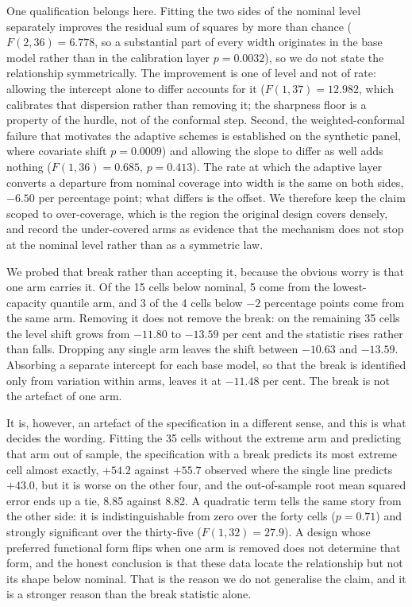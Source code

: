 \documentclass[preprint,3p,times]{elsarticle}
\providecommand{\DIFaddtex}[1]{{\protect\color{blue} \sf #1}} %
\providecommand{\DIFdeltex}[1]{{\protect\color{red} \scriptsize #1}} %
\providecommand{\DIFaddbegin}{} %
\providecommand{\DIFaddend}{} %
\providecommand{\DIFdelbegin}{} %
\providecommand{\DIFdelend}{} %
\providecommand{\DIFadd}[1]{\texorpdfstring{\DIFaddtex{#1}}{#1}} %
\providecommand{\DIFdel}[1]{\texorpdfstring{\DIFdeltex{#1}}{}} %
\begin{document}
\DIFadd{One qualification belongs here. Fitting the two sides of the nominal level separately improves the residual sum of squares by more than chance ($F(2,36)=6.778$}\DIFaddend , \DIFdelbegin \DIFdel{so a substantial part of every width originates in the base model rather than in the calibration layer }\DIFdelend \DIFaddbegin \DIFadd{$p=0.0032$), so we do not state the relationship symmetrically. The improvement is one of level and not of rate: allowing the intercept alone to differ accounts for it ($F(1,37)=12.982$}\DIFaddend , \DIFdelbegin \DIFdel{which calibrates that dispersion rather than removing it; the sharpness floor is a property of the hurdle, not of the conformal step. Second, the weighted-conformal failure that motivates the adaptive schemes is established on the synthetic panel, where covariate shift }\DIFdelend \DIFaddbegin \DIFadd{$p=0.0009$) and allowing the slope to differ as well adds nothing ($F(1,36)=0.685$, $p=0.413$). The rate at which the adaptive layer converts a departure from nominal coverage into width is the same on both sides, $-6.50$ per percentage point; what differs is the offset. We therefore keep the claim scoped to over-coverage, which is the region the original design covers densely, and record the under-covered arms as evidence that the mechanism does not stop at the nominal level rather than as a symmetric law.
}

\DIFadd{We probed that break rather than accepting it, because the obvious worry is that one arm carries it. Of the 15 cells below nominal, 5 come from the lowest-capacity quantile arm, and 3 of the 4 cells below $-2$ percentage points come from the same arm. Removing it does not remove the break: on the remaining 35 cells the level shift grows from $-11.80$ to $-13.59$ per cent and the statistic rises rather than falls. Dropping any single arm leaves the shift between $-10.63$ and $-13.59$. Absorbing a separate intercept for each base model, so that the break is identified only from variation within arms, leaves it at $-11.48$ per cent. The break is not the artefact of one arm.
}

\DIFadd{It is, however, an artefact of the specification in a different sense, and this is what decides the wording. Fitting the 35 cells without the extreme arm and predicting that arm out of sample, the specification with a break predicts its most extreme cell almost exactly, $+54.2$ against $+55.7$ observed where the single line predicts $+43.0$, but it is worse on the other four, and the out-of-sample root mean squared error ends up a tie, 8.85 against 8.82. A quadratic term tells the same story from the other side: it is indistinguishable from zero over the forty cells ($p=0.71$) and strongly significant over the thirty-five ($F(1,32)=27.9$). A design whose preferred functional form flips when one arm is removed does not determine that form, and the honest conclusion is that these data locate the relationship but not its shape below nominal. That is the reason we do not generalise the claim, and it is a stronger reason than the break statistic alone.
}
\end{document}
